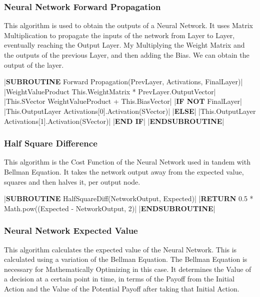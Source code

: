 \begin{flushleft}
            \subsubsection{Neural Network Forward Propagation}
                This algorithm is used to obtain the outputs of a Neural Network. It uses Matrix Multiplication to propagate the inputs
                of the network from Layer to Layer, eventually reaching the Output Layer. My Multiplying the Weight Matrix and the outputs
                of the previous Layer, and then adding the Bias. We can obtain the output of the layer.

                \vspace{0.2cm}
                \begin{pseudocode}
|\textbf{SUBROUTINE} Forward Propagation(PrevLayer, Activations, FinalLayer)|
    |WeightValueProduct \leftarrow This.WeightMatrix * PrevLayer.OutputVector|
    |This.SVector \leftarrow WeightValueProduct + This.BiasVector|
    |\textbf{IF NOT} FinalLayer|
        |This.OutputLayer \leftarrow Activations[0].Activation(SVector)|
    |\textbf{ELSE}|
        |This.OutputLayer \leftarrow Activations[1].Activation(SVector)|
    |\textbf{END IF}| 
|\textbf{ENDSUBROUTINE}|
                \end{pseudocode}

                \vspace{0.5cm}
            \subsubsection{Half Square Difference}  
                This algorithm is the Cost Function of the Neural Network used in tandem with Bellman Equation. It takes the network output
                away from the expected value, squares and then halves it, per output node.

                \begin{pseudocode}
|\textbf{SUBROUTINE} HalfSquareDiff(NetworkOutput, Expected)|  
    |\textbf{RETURN} 0.5 * Math.pow((Expected - NetworkOutput, 2)|
|\textbf{ENDSUBROUTINE}|
                \end{pseudocode}
            \subsubsection{Neural Network Expected Value}
                This algorithm calculates the expected value of the Neural Network. This is calculated using a variation of the Bellman Equation.
                The Bellman Equation is necessary for Mathematically Optimizing in this case. It determines the Value of a decision at a certain 
                point in time, in terms of the Payoff from the Initial Action and the Value of the Potential Payoff after taking that Initial
                Action. 
                

\end{flushleft}
